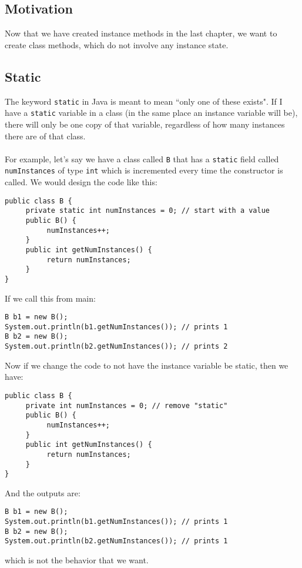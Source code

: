 
\subsection{Motivation}
Now that we have created instance methods in the last chapter, we want to create class methods, which do not involve any instance state.

\subsection{Static}
The keyword \verb|static| in Java is meant to mean ``only one of these exists". If I have a \verb|static| variable in a class (in the same place an instance variable will be), there will only be one copy of that variable, regardless of how many instances there are of that class.
\\ \\
For example, let's say we have a class called \verb|B| that has a \verb|static| field called \verb|numInstances| of type \verb|int| which is incremented every time the constructor is called. We would design the code like this:
\begin{lstlisting}
public class B {
     private static int numInstances = 0; // start with a value
     public B() {
          numInstances++;
     }
     public int getNumInstances() {
          return numInstances;
     }
}
\end{lstlisting}
If we call this from main:
\begin{lstlisting}
B b1 = new B();
System.out.println(b1.getNumInstances()); // prints 1
B b2 = new B();
System.out.println(b2.getNumInstances()); // prints 2
\end{lstlisting}
Now if we change the code to not have the instance variable be static, then we have:
\begin{lstlisting}
public class B {
     private int numInstances = 0; // remove "static"
     public B() {
          numInstances++;
     }
     public int getNumInstances() {
          return numInstances;
     }
}
\end{lstlisting}
And the outputs are:
\begin{lstlisting}
B b1 = new B();
System.out.println(b1.getNumInstances()); // prints 1
B b2 = new B();
System.out.println(b2.getNumInstances()); // prints 1
\end{lstlisting}
which is not the behavior that we want.
\\ \\
